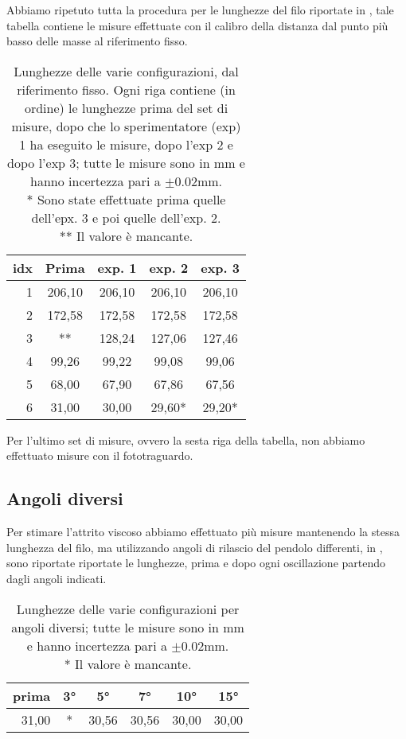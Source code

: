 Abbiamo ripetuto tutta la procedura per le lunghezze del filo riportate in , tale tabella contiene le misure effettuate con il calibro della distanza dal punto più basso delle masse al riferimento fisso.\\
\begin{table}[h]
    \centering
    \begin{tabular}{r|c|c|c|c}
        \textbf{idx} & \textbf{Prima} & \textbf{exp. 1} & \textbf{exp. 2} & \textbf{exp. 3} \\
        \hline
        1 & 206,10 & 206,10 & 206,10 & 206,10\\
        2 & 172,58 & 172,58 & 172,58 & 172,58\\
        3 & ** & 128,24 & 127,06 & 127,46\\
        4 & 99,26 & 99,22 & 99,08 & 99,06 \\
        5 & 68,00 & 67,90 & 67,86 & 67,56\\
        6 & 31,00 & 30,00 & 29,60* & 29,20*\\
    \end{tabular}
    \caption{Lunghezze delle varie configurazioni, dal riferimento fisso. Ogni riga contiene (in ordine) le lunghezze prima del set di misure, dopo che lo sperimentatore (exp) 1 ha eseguito le misure, dopo l'exp 2 e dopo l'exp 3; tutte le misure sono in mm e hanno incertezza pari a $\pm0.02$mm. \\
    * Sono state effettuate prima quelle dell'epx. 3 e poi quelle dell'exp. 2.\\
    ** Il valore è mancante.}
    \label{tab:lunghezze usate}
\end{table}

Per l'ultimo set di misure, ovvero la sesta riga della tabella, non abbiamo effettuato misure con il fototraguardo.\\

\subsection{Angoli diversi}\label{misure angoli diversi}
Per stimare l'attrito viscoso abbiamo effettuato più misure mantenendo la stessa lunghezza del filo, ma utilizzando angoli di rilascio del pendolo differenti, in , sono riportate riportate le lunghezze, prima e dopo ogni oscillazione partendo dagli angoli indicati.\\
\begin{table}[h]
    \centering
    \begin{tabular}{r|c|c|c|c|c}
        \textbf{prima} & \textbf{3°} & \textbf{5°} & \textbf{7°} & \textbf{10°} & \textbf{15°}\\
        \hline
        31,00 & * & 30,56 & 30,56 & 30,00 & 30,00\\
    \end{tabular}
    \caption{Lunghezze delle varie configurazioni per angoli diversi; tutte le misure sono in mm e hanno incertezza pari a $\pm0.02$mm.\\
    * Il valore è mancante.}
    \label{tab:lunghezze usate angoli diversi}
\end{table}

